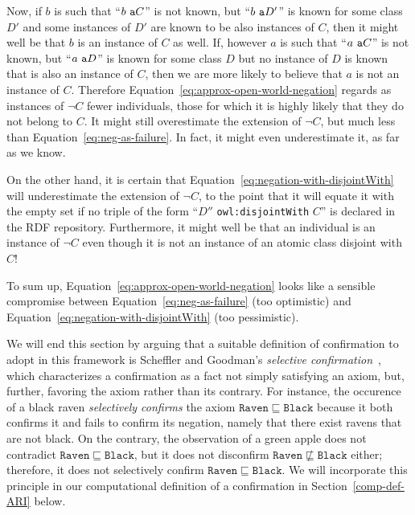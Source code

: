 \documentclass[conference]{IEEEtran}
\begin{document}
Now, if $b$ is such that ``$b \mbox{\tt\ a } C$'' is not known, but ``$b \mbox{\tt\ a } D'$''
is known for some class $D'$ and some instances of $D'$ are known to be also
instances of $C$, then it might well be that $b$ is an instance of $C$ as well.
If, however $a$ is such that ``$a \mbox{\tt\ a } C$''
is not known, but ``$a \mbox{\tt\ a } D$'' is known for some class $D$ but
no instance of $D$ is known that is also an instance of $C$, then we are more
likely to believe that $a$ is not an instance of $C$.
Therefore Equation~\ref{eq:approx-open-world-negation} regards as instances of $\neg C$
fewer individuals, those for which it is highly likely that they do not belong
to $C$. It might still overestimate the extension of $\neg C$, but much less
than Equation~\ref{eq:neg-as-failure}. In fact, it might even underestimate it,
as far as we know.

On the other hand, it is certain that Equation~\ref{eq:negation-with-disjointWith}
will underestimate the extension of $\neg C$, to the point that it will equate it
with the empty set if no triple of the form ``$D''$ \texttt{owl:disjointWith} $C$''
is declared in the RDF repository. Furthermore, it might well be that an individual
is an instance of $\neg C$ even though it is not an instance of an atomic class disjoint with $C$!

To sum up, Equation~\ref{eq:approx-open-world-negation} looks like a sensible
compromise between Equation~\ref{eq:neg-as-failure} (too optimistic)
and Equation~\ref{eq:negation-with-disjointWith} (too pessimistic).

We will end this section by arguing that a suitable definition of confirmation to adopt in this
framework is Scheffler and Goodman's \emph{selective confirmation}~\cite{SchefflerGoodman1972},
which characterizes a confirmation as a fact not simply satisfying an axiom, but, further,
favoring the axiom rather than its contrary.
For instance, the occurence of a black raven \emph{selectively confirms} the axiom
$\mathtt{Raven} \sqsubseteq \mathtt{Black}$ because it both confirms it and fails to confirm its
negation, namely that there exist ravens that are not black. On the contrary, the observation of
a green apple does not contradict $\mathtt{Raven} \sqsubseteq \mathtt{Black}$,
but it does not disconfirm $\mathtt{Raven} \not\sqsubseteq \mathtt{Black}$
either; therefore, it does not selectively confirm $\mathtt{Raven} \sqsubseteq \mathtt{Black}$.
We will incorporate this principle in our computational
definition of a confirmation in Section~\ref{comp-def-ARI} below.
\end{document}
